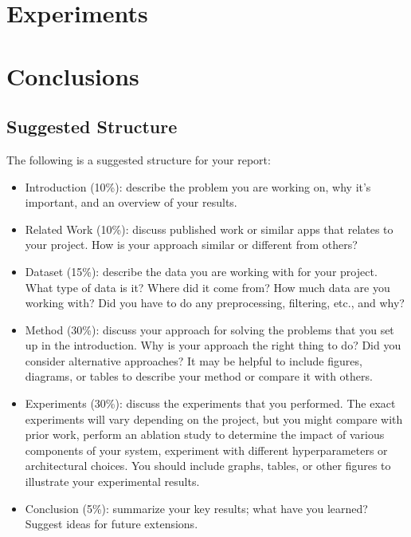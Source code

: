 \documentclass[10pt,twocolumn,letterpaper]{article}
\begin{document}
\section{Experiments}

\section{Conclusions}

\subsection{Suggested Structure}

The following is a suggested structure for your report:

\begin{itemize}
	\item Introduction (10\%): describe the problem you are working on, why it's important, and an overview of your results.
	\item Related Work (10\%): discuss published work or similar apps that relates to your project. How is your approach similar or different from others? 

	\item Dataset (15\%): describe the data you are working with for your project. What type of data is it? Where did it come from? How much data are you working with? Did you have to do any preprocessing, filtering, etc., and why?
	\item Method (30\%): discuss your approach for solving the problems that you set up in the introduction. Why is your approach the right thing to do? Did you consider alternative approaches? It may be helpful to include figures, diagrams, or tables to describe your method or compare it with others.
	\item Experiments (30\%): discuss the experiments that you performed. The exact experiments will vary depending on the project, but you might compare with prior work, perform an ablation study to determine the impact of various components of your system, experiment with different hyperparameters or architectural choices. You should include graphs, tables, or other figures to illustrate your experimental results.
	\item Conclusion (5\%): summarize your key results; what have you learned? Suggest ideas for future extensions.
\end{itemize}	

\end{document}
